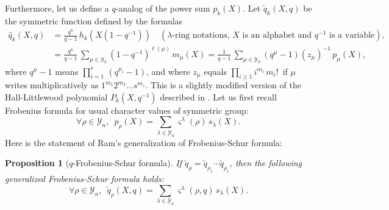 \documentclass[10pt]{amsart}
\newtheorem{proposition}[theorem]{Proposition}
\theoremstyle{remark}
\newcommand{\young}{\mathscr{Y}}
\begin{document}
Furthermore, let us define a $q$-analog of the power sum $p_k(X)$.
Let $\widetilde{q}_k(X,q)$ be the symmetric function defined by the formulas
\begin{align*}
\widetilde{q_k}(X,q)&=\frac{q^k}{q-1}\, h_k(X(1-q^{-1})) \quad (\lambda\text{-ring notations, }X\text{ is an alphabet and }q^{-1}\text{ is a variable}),\\
&=\frac{q^k}{q-1}\,\sum_{\mu \in \young_k} (1-q^{-1})^{\ell(\mu)} \,m_\mu(X)=\frac{1}{q-1} \,\sum_{\mu \in \young_k} (q^\mu-1)(z_\mu)^{-1}\,p_\mu(X),
\end{align*}
where $q^\mu-1$ means $\prod_{i=1}^r \,(q^{\mu_i}-1)$, and where $z_\mu$ equals $\prod_{i \geq 1} i^{m_i}\,m_i!\,$ if $\mu$ writes multiplicatively as $1^{m_1}2^{m_2}\ldots s^{m_s}$. This is a slightly modified version of the Hall-Littlewood polynomial $P_k(X,q^{-1})$ described in \cite[Chapter 3]{Mac95}. Let us first recall Frobenius formula for usual character values of symmetric group:
$$\forall \rho \in \young_n,\,\,\,p_\rho(X)=\sum_{\lambda \in \young_n} \varsigma^{\lambda}(\rho)\,s_\lambda(X).$$
Here is the statement of Ram's generalization of Frobenius-Schur formula:
\begin{proposition}[$q$-Frobenius-Schur formula]\label{quantumcross}
If $\widetilde{q}_\rho=\widetilde{q}_{\rho_1}\cdots \widetilde{q}_{\rho_r}$, then the following generalized Frobenius-Schur formula holds:
$$\forall \rho \in \young_n,\,\,\,\widetilde{q}_\rho(X,q)=\sum_{\lambda \in \young_n} \varsigma^{\lambda}(\rho,q)\,s_\lambda(X).$$
\end{proposition}\bigskip
\end{document}
